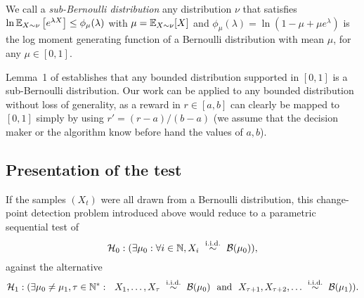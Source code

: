 \begin{definition}
    We call a \emph{sub-Bernoulli distribution} any distribution $\nu$ that satisfies
    $\ln \mathbb{E}_{X\sim\nu}\left[e^{\lambda X}\right] \leq \phi_{\mu}(\lambda)$ with $\mu=\mathbb{E}_{X\sim \nu}[X]$ and $\phi_{\mu}(\lambda) = \ln(1-\mu + \mu e^\lambda)$ is the log moment generating function of a Bernoulli distribution with mean $\mu$, for any $\mu\in[0,1]$.
\end{definition}

Lemma~1 of \cite{KLUCBJournal} establishes that any bounded distribution supported in $[0,1]$ is a sub-Bernoulli distribution.
Our work can be applied to any bounded distribution without loss of generality, as a reward in $r\in[a,b]$ can clearly be mapped to $[0,1]$ simply by using $r' = (r-a)/(b-a)$ (we assume that the decision maker or the algorithm know before hand the values of $a,b$).


\subsection{Presentation of the test}\label{sub:6:presentationOfGLRTest}

If the samples $(X_t)$ were all drawn from a Bernoulli distribution, this change-point detection problem introduced above would reduce to a parametric sequential test of
\[\cH_0 : (\exists \mu_0: \forall i\in\N, X_i \ \overset{\text{i.i.d.}}{\sim} \ \cB(\mu_0)),\]
against the alternative
\[\cH_1 : (\exists \mu_0 \neq \mu_1, \tau \in \N^*: \ \  X_1, \ldots, X_\tau \ \overset{\text{i.i.d.}}{\sim} \ \cB(\mu_0) \ \ \text{and} \ \ X_{\tau+1}, X_{\tau+2}, \ldots \ \overset{\text{i.i.d.}}{\sim} \ \cB(\mu_1)).\]

